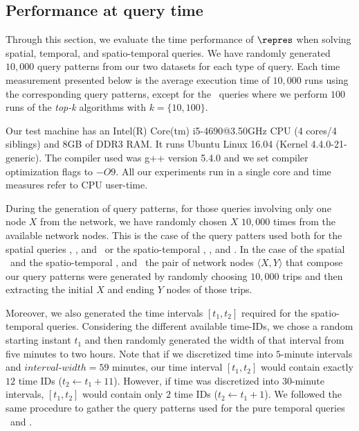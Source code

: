 



\subsection{Performance at query time}
Through this section, we evaluate the time performance of $\repres$ when solving spatial, temporal, and spatio-temporal queries.
We have randomly generated $10,\!000$ query patterns from our two datasets for each type of query.
Each time measurement presented below is the average execution time of $10,\!000$ runs using the corresponding query patterns, 
except for the \Stk\ queries where we perform $100$ runs of the {\em top-k} algorithms with $k=\{10,100\}$.

Our test machine has an Intel(R) Core(tm) i5-4690@3.50GHz CPU (4 cores/4 siblings) and 8GB of DDR3 RAM. 
It runs Ubuntu Linux 16.04 (Kernel 4.4.0-21-generic). The compiler used was g++ version 5.4.0 and we set compiler optimization flags to $-O9$. All our experiments run in a single core and time measures refer to CPU user-time.

During the generation of query patterns, for those queries involving only one node $X$ from the network, 
we have randomly chosen $X$ $10,\!000$ times from the available network nodes. 
This is the case of the query patters used both for
the spatial queries \Sswx, \Sewx, and \Sux\ or the spatio-temporal \Tswx, \Tewx, and \Tux.
In the case of the spatial \Sfxty\ and the spatio-temporal \Tfxtys, and \Tfxtyw\ the pair of
network nodes $\langle X,Y \rangle$ that compose our
query patterns were generated by randomly choosing
$10,\!000$ trips and then extracting the initial $X$ and ending $Y$ nodes of those trips.

Moreover, we also generated the time intervals $[t_1,t_2]$ required for 
the spatio-temporal queries. Considering the different available time-IDs, we chose a random starting
instant $t_1$ and then randomly generated the width of that interval from five minutes to two hours.
Note that if we discretized time into $5$-minute intervals and $interval$-$width=59$ minutes, our time
interval $[t_1,t_2]$ would contain exactly $12$ time IDs ($t_2\leftarrow t_1+11$). However, if time was
discretized into $30$-minute intervals, $[t_1,t_2]$ would contain only $2$ time IDs ($t_2\leftarrow t_1+1$).
We followed the same procedure to gather the query patterns used for the pure temporal queries \Tut\ and \Tst.


